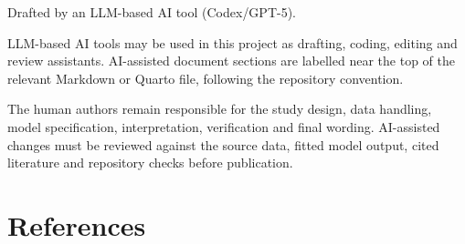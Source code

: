 \documentclass[
  11pt,
  a4paper,
]{report}
\begin{document}
\hfill\break

\begin{tcolorbox}[enhanced jigsaw, arc=.35mm, bottomrule=.15mm, bottomtitle=1mm, breakable, colback=white, colbacktitle=quarto-callout-note-color!10!white, colframe=quarto-callout-note-color-frame, coltitle=black, left=2mm, leftrule=.75mm, opacityback=0, opacitybacktitle=0.6, rightrule=.15mm, title=\textcolor{quarto-callout-note-color}{\faInfo}\hspace{0.5em}{Note}, titlerule=0mm, toprule=.15mm, toptitle=1mm]

Drafted by an LLM-based AI tool (Codex/GPT-5).

\end{tcolorbox}

LLM-based AI tools may be used in this project as drafting, coding,
editing and review assistants. AI-assisted document sections are
labelled near the top of the relevant Markdown or Quarto file, following
the repository convention.

The human authors remain responsible for the study design, data
handling, model specification, interpretation, verification and final
wording. AI-assisted changes must be reviewed against the source data,
fitted model output, cited literature and repository checks before
publication.

\chapter*{References}\label{references}

\end{document}
